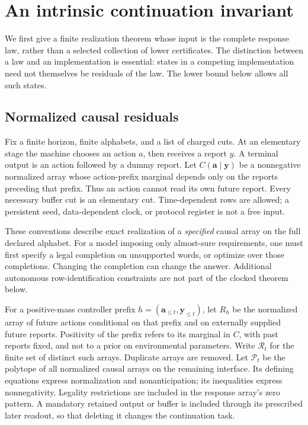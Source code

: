\section{An intrinsic continuation invariant}
\label{sec:intrinsic29}
We first give a finite realization theorem whose input is the complete
response law, rather than a selected collection of lower certificates.
The distinction between a law and an implementation is essential:
states in a competing implementation need not themselves be residuals
of the law. The lower bound below allows all such states.

\subsection{Normalized causal residuals}
Fix a finite horizon, finite alphabets, and a list of charged cuts.
At an elementary stage the machine chooses an action $a$, then receives
a report $y$. A terminal output is an action followed by a dummy report.
Let $C(\mathbf a\mid\mathbf y)$ be a nonnegative normalized array whose
action-prefix marginal depends only on the reports preceding that prefix.
Thus an action cannot read its own future report. Every necessary buffer
cut is an elementary cut. Time-dependent rows are allowed; a persistent
seed, data-dependent clock, or protocol register is not a free input.

These conventions describe exact realization of a \emph{specified}
causal array on the full declared alphabet. For a model imposing only
almost-sure requirements, one must first specify a legal completion on
unsupported words, or optimize over those completions. Changing the
completion can change the answer. Additional autonomous row-identification
constraints are not part of the clocked theorem below.

For a positive-mass controller prefix $h=(\mathbf a_{\le t},
\mathbf y_{\le t})$, let $R_h$ be the normalized array of future actions
conditional on that prefix and on externally supplied future reports.
Positivity of the prefix refers to its marginal in $C$, with past reports
fixed, and not to a prior on environmental parameters. Write $\mathscr R_t$
for the finite set of distinct such arrays. Duplicate arrays are removed.
Let $\mathscr P_t$ be the polytope of all normalized causal arrays on the
remaining interface. Its defining equations express normalization and
nonanticipation; its inequalities express nonnegativity. Legality
restrictions are included in the response array's zero pattern. A
mandatory retained output or buffer is included through its prescribed
later readout, so that deleting it changes the continuation task.

